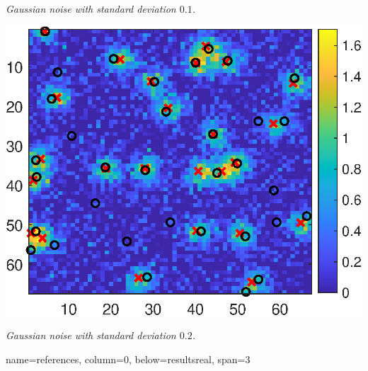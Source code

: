 \documentclass[a0paper,portrait,fontscale=0.35]{baposter}
\newcommand{\mycaption}[1]{
  {
    \smaller
    \emph{#1}
  }
}
\theoremstyle{plain}
\theoremstyle{plain}
\theoremstyle{definition}
\theoremstyle{plain}
\theoremstyle{definition}
\begin{document}
\begin{poster}
{\begin{minipage}[t]{0.48\textwidth}
\begin{minipage}[h]{\textwidth}
\begin{minipage}[t]{0.49\textwidth}
        \vspace{-0.3em}
        \mycaption{
          Gaussian noise with standard deviation $0.1$.
        }
      \end{minipage}
      \begin{minipage}[t]{0.49\textwidth}
        \centering
        \includegraphics[height=0.1\textheight]{img/2d_noise_02_nolegend.eps}

        \vspace{-0.3em}
        \mycaption{
          Gaussian noise with standard deviation $0.2$.
        }
      \end{minipage}
    \end{minipage}
  \end{minipage}
  \vspace{-1em}
}

{name=references, column=0,  below=resultsreal, span=3}
{
  \tiny
  \renewcommand{\section}[2]{\vspace{0.05em}}	%
  
}


\end{poster}
\end{document}
